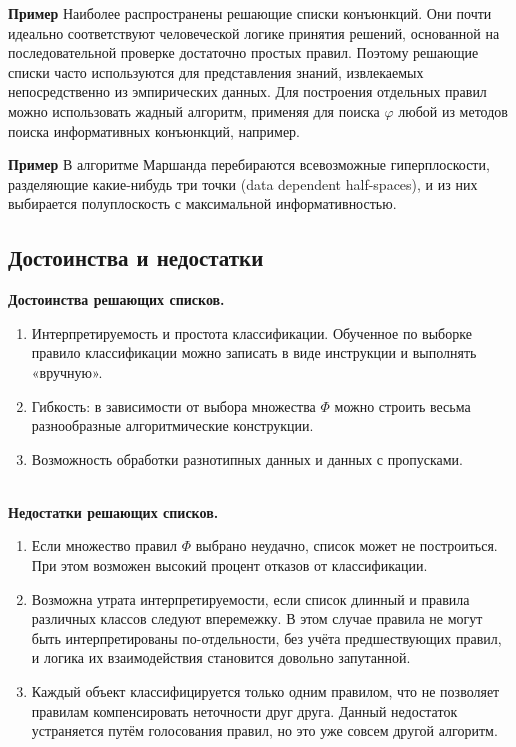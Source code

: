 \textbf{Пример} Наиболее распространены решающие списки конъюнкций. Они почти
идеально соответствуют человеческой логике принятия решений, основанной на последовательной проверке достаточно простых правил. Поэтому решающие списки
часто используются для представления знаний, извлекаемых непосредственно из эмпирических данных. Для построения отдельных правил можно использовать жадный алгоритм, применяя для поиска $\varphi$ любой из методов поиска информативных конъюнкций,
например.

\textbf{Пример} В алгоритме Маршанда перебираются всевозможные гиперплоскости, разделяющие какие-нибудь три точки (data dependent half-spaces), и из них выбирается полуплоскость с максимальной информативностью.

\subsection{Достоинства и недостатки}

\textbf{Достоинства решающих списков.}
\begin{enumerate}
    \item Интерпретируемость и простота классификации. Обученное по выборке правило классификации можно записать в виде инструкции и выполнять «вручную».
    \item Гибкость: в зависимости от выбора множества $\Phi$ можно строить весьма разнообразные алгоритмические конструкции.
    \item Возможность обработки разнотипных данных и данных с пропусками.
\end{enumerate}
\\
\textbf{Недостатки решающих списков.}
\begin{enumerate}
    \item Если множество правил $\Phi$ выбрано неудачно, список может не построиться. При этом возможен высокий процент отказов от классификации.
    \item Возможна утрата интерпретируемости, если список длинный и правила различных классов следуют вперемежку. В этом случае правила не могут быть
    интерпретированы по-отдельности, без учёта предшествующих правил, и логика их взаимодействия становится довольно запутанной.
    \item Каждый объект классифицируется только одним правилом, что не позволяет
    правилам компенсировать неточности друг друга. Данный недостаток устраняется путём голосования правил, но это уже совсем другой алгоритм.
\end{enumerate}

